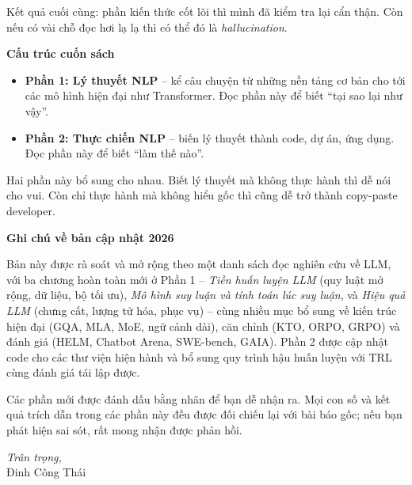 Kết quả cuối cùng: phần kiến thức cốt lõi thì mình đã kiểm tra lại cẩn thận. 
Còn nếu  có vài chỗ đọc hơi lạ lạ thì có thể đó là \textit{hallucination}.


\vspace{1em}
\noindent
\textbf{Cấu trúc cuốn sách}  

\begin{itemize}[leftmargin=*]
    \item \textbf{Phần 1: Lý thuyết NLP} – kể câu chuyện từ những nền tảng cơ bản cho tới các mô hình hiện đại như Transformer. Đọc phần này để biết “tại sao lại như vậy”.  
    \item \textbf{Phần 2: Thực chiến NLP} – biến lý thuyết thành code, dự án, ứng dụng. Đọc phần này để biết “làm thế nào”.  
\end{itemize}

Hai phần này bổ sung cho nhau. Biết lý thuyết mà không thực hành thì dễ nói cho vui. Còn chỉ thực hành mà không hiểu gốc thì cũng dễ trở thành copy-paste developer.  

\vspace{1em}
\noindent
\textbf{Ghi chú về bản cập nhật 2026}

Bản này được rà soát và mở rộng theo một danh sách đọc nghiên cứu về LLM, với ba chương hoàn toàn mới ở Phần 1 -- \textit{Tiền huấn luyện LLM} (quy luật mở rộng, dữ liệu, bộ tối ưu), \textit{Mô hình suy luận và tính toán lúc suy luận}, và \textit{Hiệu quả LLM} (chưng cất, lượng tử hóa, phục vụ) -- cùng nhiều mục bổ sung về kiến trúc hiện đại (GQA, MLA, MoE, ngữ cảnh dài), căn chỉnh (KTO, ORPO, GRPO) và đánh giá (HELM, Chatbot Arena, SWE-bench, GAIA). Phần 2 được cập nhật code cho các thư viện hiện hành và bổ sung quy trình hậu huấn luyện với TRL cùng đánh giá tái lập được.

Các phần mới được đánh dấu bằng nhãn \newtag{} để bạn dễ nhận ra. Mọi con số và kết quả trích dẫn trong các phần này đều được đối chiếu lại với bài báo gốc; nếu bạn phát hiện sai sót, rất mong nhận được phản hồi.

\begin{flushright}
\textit{Trân trọng,} \\[0.5em]
Đinh Công Thái
\end{flushright}
